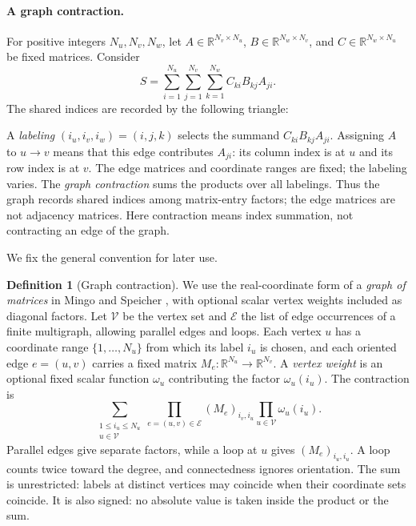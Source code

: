 \documentclass[11pt]{article}
\theoremstyle{definition}
\newtheorem{definition}{Definition}[section]
\theoremstyle{remark}
\theoremstyle{plain}
\newcommand{\R}{\mathbb R}
\begin{document}
\paragraph{A graph contraction.}
For positive integers $N_u,N_v,N_w$, let
$A\in\R^{N_v\times N_u}$, $B\in\R^{N_w\times N_v}$, and
$C\in\R^{N_w\times N_u}$ be fixed matrices. Consider
\[
 S=\sum_{i=1}^{N_u}\sum_{j=1}^{N_v}\sum_{k=1}^{N_w}
       C_{ki}B_{kj}A_{ji}.
\]
The shared indices are recorded by the following triangle:
\begin{center}
\end{center}
A \emph{labeling} $(i_u,i_v,i_w)=(i,j,k)$ selects the summand
$C_{ki}B_{kj}A_{ji}$. Assigning $A$ to $u\to v$ means that this
edge contributes $A_{ji}$: its column index is at $u$ and its row
index is at $v$. The edge matrices and coordinate ranges are fixed;
the labeling varies. The \emph{graph contraction} sums the products
over all labelings. Thus the graph records shared indices among
matrix-entry factors; the edge matrices are not adjacency matrices.
Here contraction means index summation, not contracting an edge
of the graph.

We fix the general convention for later use.

\begin{definition}[Graph contraction]\label{def:graph-contraction}
We use the real-coordinate form of a \emph{graph of matrices} in
Mingo and Speicher \cite[Definition~8 and Eq.~(9), pp.~2279--2280]{mingo},
with optional scalar vertex weights included as diagonal factors.
Let $\mathcal V$ be the vertex set
and $\mathcal E$ the list of edge occurrences of a finite multigraph,
allowing parallel edges and loops. Each vertex $u$ has a coordinate
range $\{1,\ldots,N_u\}$ from which its label $i_u$ is chosen,
and each oriented edge $e=(u,v)$ carries
a fixed matrix $M_e:\R^{N_u}\to\R^{N_v}$. A \emph{vertex weight}
is an optional fixed scalar function $\omega_u$ contributing the
factor $\omega_u(i_u)$. The contraction is
\begin{equation}\label{eq:graph-contraction}
 \sum_{\substack{1\le i_u\le N_u\\u\in\mathcal V}}
       \prod_{e=(u,v)\in\mathcal E}(M_e)_{i_v,i_u}
       \prod_{u\in\mathcal V}\omega_u(i_u).
\end{equation}
Parallel edges give separate factors, while a loop at $u$ gives
$(M_e)_{i_u,i_u}$. A loop counts twice toward the degree, and
connectedness ignores orientation. The sum is unrestricted:
labels at distinct vertices may coincide when their coordinate
sets coincide. It is also signed: no absolute value is taken inside
the product or the sum.
\end{definition}
\end{document}
